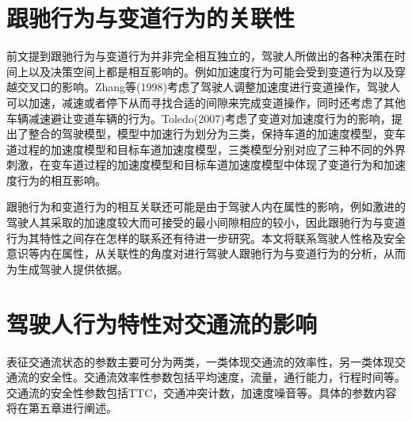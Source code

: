 \section{跟驰行为与变道行为的关联性}
前文提到跟驰行为与变道行为并非完全相互独立的，驾驶人所做出的各种决策在时间上以及决策空间上都是相互影响的。例如加速度行为可能会受到变道行为以及穿越交叉口的影响。Zhang等(1998)考虑了驾驶人调整加速度进行变道操作，驾驶人可以加速，减速或者停下从而寻找合适的间隙来完成变道操作，同时还考虑了其他车辆减速避让变道车辆的行为\cite{Zhang1998a}。Toledo(2007)考虑了变道对加速度行为的影响，提出了整合的驾驶模型，模型中加速行为划分为三类，保持车道的加速度模型，变车道过程的加速度模型和目标车道加速度模型，三类模型分别对应了三种不同的外界刺激，在变车道过程的加速度模型和目标车道加速度模型中体现了变道行为和加速度行为的相互影响\cite{Toledo2007}。

跟驰行为和变道行为的相互关联还可能是由于驾驶人内在属性的影响，例如激进的驾驶人其采取的加速度较大而可接受的最小间隙相应的较小，因此跟驰行为与变道行为其特性之间存在怎样的联系还有待进一步研究。本文将联系驾驶人性格及安全意识等内在属性，从关联性的角度对进行驾驶人跟驰行为与变道行为的分析，从而为生成驾驶人提供依据。
%




\section{驾驶人行为特性对交通流的影响}
表征交通流状态的参数主要可分为两类，一类体现交通流的效率性，另一类体现交通流的安全性。交通流效率性参数包括平均速度，流量，通行能力，行程时间等。交通流的安全性参数包括TTC，交通冲突计数，加速度噪音等。具体的参数内容将在第五章进行阐述。

